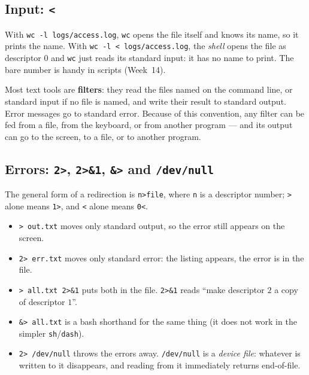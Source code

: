 \documentclass[11pt,a4paper]{article}
\newcommand{\term}[1]{\textbf{\color{mintdeep}#1}}
\newcommand{\cmd}[1]{\texttt{#1}}
\begin{document}
\subsection{Input: \texttt{<}}



With \cmd{wc -l logs/access.log}, \cmd{wc} opens the file itself and knows its name, so it prints the name. With \cmd{wc -l < logs/access.log}, the \emph{shell} opens the file as descriptor $0$ and \cmd{wc} just reads its standard input: it has no name to print. The bare number is handy in scripts (Week~14).

\begin{keyidea}
Most text tools are \term{filters}: they read the files named on the command line, or standard input if no file is named, and write their result to standard output. Error messages go to standard error. Because of this convention, any filter can be fed from a file, from the keyboard, or from another program --- and its output can go to the screen, to a file, or to another program.
\end{keyidea}

\subsection{Errors: \texttt{2>}, \texttt{2>\&1}, \texttt{\&>} and \texttt{/dev/null}}

The general form of a redirection is \texttt{n>file}, where \texttt{n} is a descriptor number; \texttt{>} alone means \texttt{1>}, and \texttt{<} alone means \texttt{0<}.




\begin{itemize}
  \item \cmd{> out.txt} moves only standard output, so the error still appears on the screen.
  \item \cmd{2> err.txt} moves only standard error: the listing appears, the error is in the file.
  \item \cmd{> all.txt 2>\&1} puts both in the file. \cmd{2>\&1} reads ``make descriptor $2$ a copy of descriptor $1$''.
  \item \cmd{\&> all.txt} is a bash shorthand for the same thing (it does not work in the simpler \cmd{sh}/\cmd{dash}).
  \item \cmd{2> /dev/null} throws the errors away. \texttt{/dev/null} is a \emph{device file}: whatever is written to it disappears, and reading from it immediately returns end-of-file.
\end{itemize}
\end{document}
